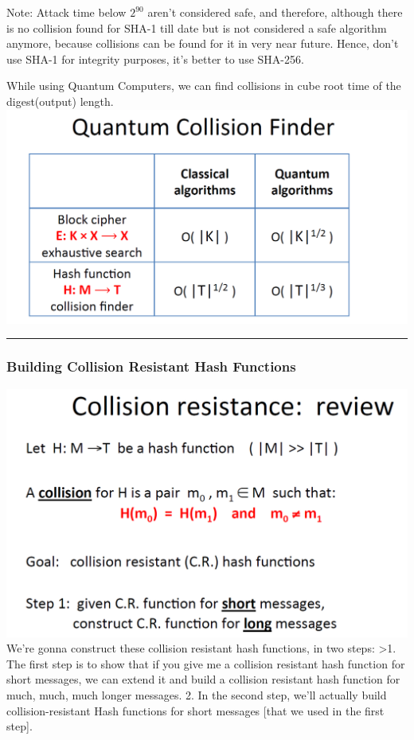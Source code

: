 \documentclass[11pt]{article}
\makeatletter
\def\maxwidth{\ifdim\Gin@nat@width>\linewidth\linewidth
    \else\Gin@nat@width\fi}
\let\Oldincludegraphics\includegraphics
\renewcommand{\includegraphics}[1]{\Oldincludegraphics[width=.8\maxwidth]{#1}}
\makeatother
\begin{document}
Note: Attack time below \(2^{90}\) aren't considered safe, and
therefore, although there is no collision found for SHA-1 till date but
is not considered a safe algorithm anymore, because collisions can be
found for it in very near future. Hence, don't use SHA-1 for integrity
purposes, it's better to use SHA-256.

While using Quantum Computers, we can find collisions in cube root time
of the digest(output) length.
\includegraphics{./Images/QuantumFinder.png}

\begin{center}\rule{0.5\linewidth}{\linethickness}\end{center}

    \hypertarget{building-collision-resistant-hash-functions}{%
\subsubsection{Building Collision Resistant Hash
Functions}\label{building-collision-resistant-hash-functions}}

\includegraphics{./Images/Goal-CRHashFxn.png} We're gonna construct
these collision resistant hash functions, in two steps: \textgreater{}1.
The first step is to show that if you give me a collision resistant hash
function for short messages, we can extend it and build a collision
resistant hash function for much, much, much longer messages. 2. In the
second step, we'll actually build collision-resistant Hash functions for
short messages {[}that we used in the first step{]}.
\end{document}
